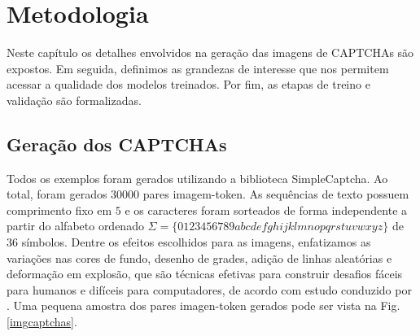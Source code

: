 \chapter{Metodologia} \label{cap:metodologia}

Neste capítulo os detalhes envolvidos na geração das imagens de CAPTCHAs são expostos. Em seguida, definimos as grandezas de interesse que nos permitem acessar a qualidade dos modelos treinados. Por fim, as etapas de treino e validação são formalizadas.


\section{Geração dos CAPTCHAs}

Todos os exemplos foram gerados utilizando a biblioteca SimpleCaptcha\cite{simplecaptcha}. Ao total, foram gerados $30000$ pares imagem-token.
As sequências de texto possuem comprimento fixo em $5$ e os caracteres foram sorteados de forma independente a partir do alfabeto ordenado $\Sigma = \{0123456789abcdefghijklmnopqrstuvwxyz\}$ de $36$ símbolos. Dentre os efeitos escolhidos para as imagens, enfatizamos as variações nas cores de fundo, desenho de grades, adição de linhas aleatórias e deformação em explosão, que são técnicas efetivas para construir desafios fáceis para humanos e difíceis para computadores, de acordo com estudo conduzido por \cite{lectures2005HIP}. Uma pequena amostra dos pares imagen-token gerados pode ser vista na Fig.\ref{imgcaptchas}. 

